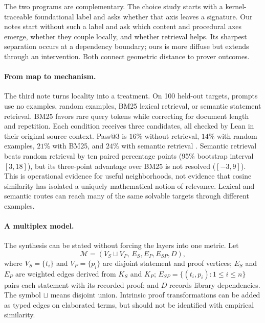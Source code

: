 \documentclass[11pt]{article}
\begin{document}
The two programs are complementary.  The choice study starts with a kernel-traceable foundational
label and asks whether that axis leaves a signature.  Our notes start without such a label and ask
which content and procedural axes emerge, whether they couple locally, and whether retrieval helps.
Its sharpest separation occurs at a dependency boundary; ours is more diffuse but extends through
an intervention.  Both connect geometric distance to prover outcomes.

\paragraph{From map to mechanism.}
The third note turns locality into a treatment.  On 100 held-out targets, prompts use no examples,
random examples, BM25 lexical retrieval, or semantic statement retrieval.  BM25 favors rare query
tokens while correcting for document length and repetition.  Each condition receives three
candidates, all checked by Lean in their original source context.  Pass@3 is $16\%$ without retrieval,
$14\%$ with random examples, $21\%$ with BM25, and $24\%$ with semantic retrieval
\cite{nearby}.  Semantic retrieval beats random retrieval by ten paired percentage points
(95\% bootstrap interval $[3,18]$), but its three-point advantage over BM25 is not resolved
($[-3,9]$).  This is operational evidence for useful neighborhoods, not evidence that cosine
similarity has isolated a uniquely mathematical notion of relevance.  Lexical and semantic
routes can reach many of the same solvable targets through different examples.

\paragraph{A multiplex model.}
The synthesis can be stated without forcing the layers into one metric.  Let
\[
 \mathcal{M}=(V_S\sqcup V_P,\,E_S,E_P,E_{SP},D),
\]
where $V_S=\{t_i\}$ and $V_P=\{p_i\}$ are disjoint statement and proof vertices; $E_S$ and $E_P$
are weighted edges derived from $K_S$ and $K_P$; $E_{SP}=\{(t_i,p_i):1\leq i\leq n\}$ pairs each
statement with its recorded proof; and $D$ records library dependencies.  The symbol $\sqcup$
means disjoint union.  Intrinsic proof transformations can be added as typed edges on elaborated
terms, but should not be identified with empirical similarity.
\end{document}
